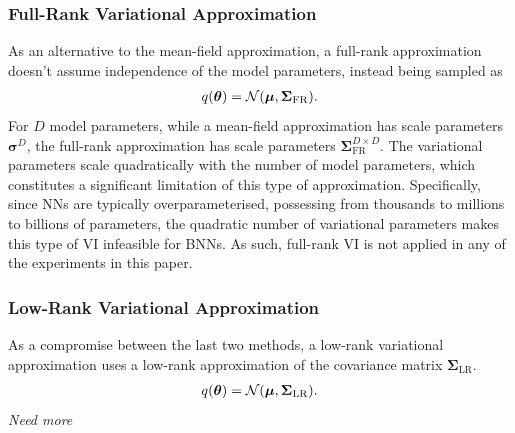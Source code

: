\documentclass[10pt,a4paper,twocolumn]{article}
\begin{document}
\subsubsection{Full-Rank Variational Approximation}
As an alternative to the mean-field approximation, a full-rank approximation doesn't assume independence of the model parameters, instead being sampled as
\begin{align}\label{eq:fullrank}
    q(\bm \theta) = \mathcal{N}(\bm \mu, \bm \Sigma_{\mathrm{FR}}).
\end{align}
For \(D\) model parameters, while a mean-field approximation has scale parameters \(\bm \sigma^D\), the full-rank approximation has scale parameters \(\bm \Sigma_{\mathrm{FR}}^{D \times D}\).
The variational parameters scale quadratically with the number of model parameters, which constitutes a significant limitation of this type of approximation.
Specifically, since NNs are typically overparameterised, possessing from thousands to millions to billions of parameters, the quadratic number of variational parameters makes this type of VI infeasible for BNNs.
As such, full-rank VI is not applied in any of the experiments in this paper.

\subsubsection{Low-Rank Variational Approximation}
As a compromise between the last two methods, a low-rank variational approximation uses a low-rank approximation of the covariance matrix \(\bm \Sigma_{\mathrm{LR}}\).
\begin{align}\label{eq:lowrank}
    q(\bm \theta) = \mathcal{N}(\bm \mu, \bm \Sigma_{\mathrm{LR}}).
\end{align}
\emph{Need more}
\end{document}
